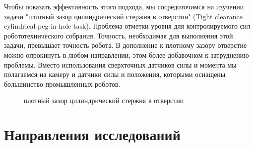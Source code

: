 \documentclass[a4paper,12pt]{article}
\begin{document}
Чтобы показать эффективность этого подхода, мы сосредоточимся на изучении задачи "плотный зазор цилиндрический стержня в отверстии" (Tight clearance cylindrical peg-in-hole task). Проблема отметки уровня для контролируемого сил робототехнического собрания. Точность, необходимая для выполнения этой задачи, превышает точность робота. В дополнение к плотному зазору отверстие можно опрокинуть в любом направлении, этом более добавочном к затруднению проблемы. Вместо использования сверхточных датчиков силы и момента мы полагаемся на камеру и датчики силы и положения, которыми оснащены большинство промышленных роботов.
\begin{figure}[h]%
    \centering
    \qquad
    \caption{плотный зазор цилиндрический стержня в отверстии}%
    \label{fig:example}%
\end{figure}

\newpage
\section{Направления исследований } 
\end{document}
